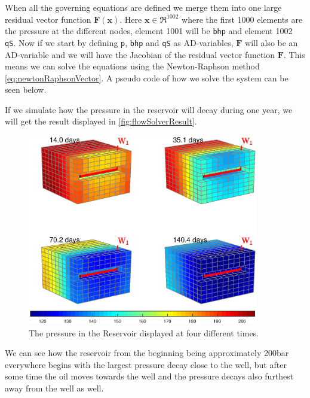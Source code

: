 When all the governing equations are defined we merge them into one large residual vector function $\boldsymbol{F}(\boldsymbol{x})$. Here $\boldsymbol{x}\in\Re^1002$ where the first 1000 elements are the pressure at the different nodes, element 1001 will be \texttt{bhp} and element 1002 \texttt{qS}. Now if we start by defining \texttt{p}, \texttt{bhp} and \texttt{qS} as AD-variables, $\boldsymbol{F}$ will also be an AD-variable and we will have the Jacobian of the residual vector function $\boldsymbol{F}$. This means we can solve the equations using the Newton-Raphson method \eqref{eq:newtonRaphsonVector}. A pseudo code of how we solve the system can be seen below.

If we simulate how the pressure in the reservoir will decay during one year, we will get the result displayed in \autoref{fig:flowSolverResult}.
\begin{figure}[htbp]
    \centering
    \includegraphics[width = 0.9\textwidth]{figures/flowSolver_result.eps}
    \caption{The pressure in the Reservoir displayed at four different times.}
    \label{fig:flowSolverResult}
\end{figure}
We can see how the reservoir from the beginning being approximately 200bar everywhere begins with the largest pressure decay close to the well, but after some time the oil moves towards the well and the pressure decays also furthest away from the well as well. 


